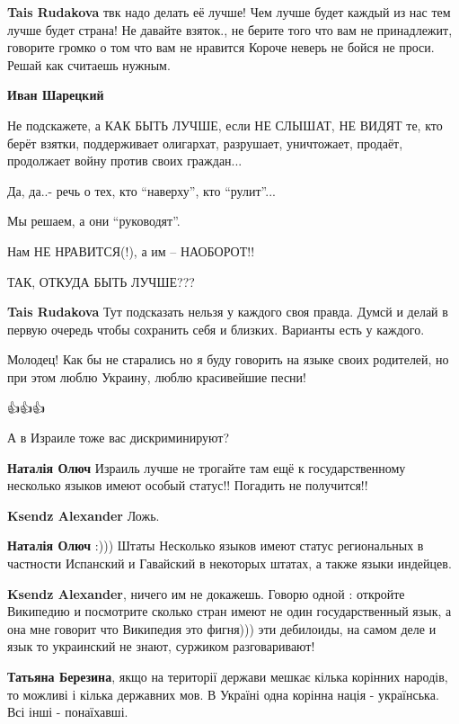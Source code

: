 \begin{itemize}
\begin{itemize}
\textbf{Tais Rudakova} твк надо делать её лучше! Чем лучше будет каждый из нас тем лучше будет страна! Не давайте взяток., не берите того что вам не принадлежит, говорите громко о том что вам не нравится Короче неверь не бойся не проси. Решай как считаешь нужным.

\textbf{Иван Шарецкий}

Не подскажете, а КАК БЫТЬ ЛУЧШЕ, если НЕ СЛЫШАТ, НЕ ВИДЯТ те, кто берёт взятки,
поддерживает олигархат, разрушает, уничтожает, продаёт, продолжает войну против
своих граждан...

Да, да..- речь о тех, кто \enquote{наверху}, кто \enquote{рулит}...

Мы решаем, а они \enquote{руководят}.

Нам НЕ НРАВИТСЯ(!), а им -- НАОБОРОТ!!

ТАК, ОТКУДА БЫТЬ ЛУЧШЕ???

\textbf{Tais Rudakova} Тут подсказать нельзя у каждого своя правда. Думсй и
делай в первую очередь чтобы сохранить себя и близких. Варианты есть у каждого.
\end{itemize}

Молодец! Как бы не старались но я буду говорить на языке своих родителей, но
при этом люблю Украину, люблю красивейшие песни!

👍👍👍

А в Израиле тоже вас дискриминируют?

\begin{itemize}

\textbf{Наталія Олюч} 
Израиль лучше не трогайте там ещё к государственному несколько языков имеют
особый статус!! Погадить не получится!!

\textbf{Ksendz Alexander} Ложь.

\textbf{Наталія Олюч} :))) Штаты Несколько языков имеют статус региональных в частности Испанский и Гавайский в некоторых штатах, а также языки индейцев.

\textbf{Ksendz Alexander}, ничего им не докажешь. Говорю одной : откройте Википедию и посмотрите сколько стран имеют не один государственный язык, а она мне говорит что Википедия это фигня))) эти дебилоиды, на самом деле и язык то украинский не знают, суржиком разговаривают!

\textbf{Татьяна Березина}, якщо на території держави мешкає кілька корінних
народів, то можливі і кілька державних мов. В Україні одна корінна нація -
українська. Всі інші - понаїхавші.


\end{itemize}
\end{itemize}

